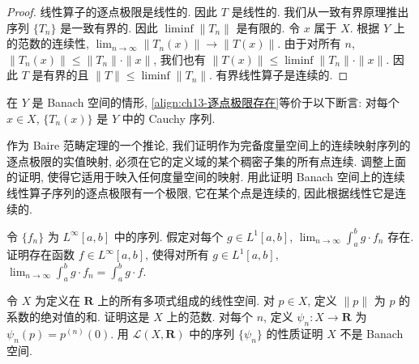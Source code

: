 \documentclass[../../main.tex]{subfiles}
\begin{document}
\begin{proof}
线性算子的逐点极限是线性的. 因此 $T$ 是线性的. 我们从一致有界原理推出序列 $\{T_{n}\}$ 是一致有界的. 因此 $\liminf\|T_{n}\|$ 是有限的. 令 $x$ 属于 $X$. 根据 $Y$ 上的范数的连续性, $\lim_{n\to\infty}\|T_{n}(x)\|\to\|T(x)\|$. 由于对所有 $n$, $\|T_{n}(x)\|\leqslant\|T_{n}\|\cdot\|x\|$, 我们也有 $\|T(x)\|\leqslant\liminf\|T_{n}\|\cdot\|x\|$. 因此 $T$ 是有界的且 $\|T\|\leqslant\liminf\|T_{n}\|$. 有界线性算子是连续的.
\end{proof}

在 $Y$ 是 Banach 空间的情形, \eqref{align:ch13-逐点极限存在}等价于以下断言: 对每个 $x\in X$, $\{T_{n}(x)\}$ 是 $Y$ 中的 Cauchy 序列.

\begin{exercise}\label{exercise:ch13-38}
作为 Baire 范畴定理的一个推论, 我们证明作为完备度量空间上的连续映射序列的逐点极限的实值映射, 必须在它的定义域的某个稠密子集的所有点连续. 调整上面的证明, 使得它适用于映入任何度量空间的映射. 用此证明 Banach 空间上的连续线性算子序列的逐点极限有一个极限, 它在某个点是连续的, 因此根据线性它是连续的.
\end{exercise}

\begin{exercise}\label{exercise:ch13-39}
令 $\{f_{n}\}$ 为 $L^{\infty}[a,b]$ 中的序列. 假定对每个 $g\in L^{1}[a,b]$, $\lim_{n\to\infty}\int_{a}^{b}g\cdot f_{n}$ 存在. 证明存在函数 $f\in L^{\infty}[a,b]$, 使得对所有 $g\in L^{1}[a,b]$, $\lim_{n\to\infty}\int_{a}^{b}g\cdot f_{n}=\int_{a}^{b}g\cdot f$.
\end{exercise}

\begin{exercise}\label{exercise:ch13-40}
令 $X$ 为定义在 $\mathbf{R}$ 上的所有多项式组成的线性空间. 对 $p\in X$, 定义 $\|p\|$ 为 $p$ 的系数的绝对值的和. 证明这是 $X$ 上的范数. 对每个 $n$, 定义 $\psi_{n}:X\to\mathbf{R}$ 为 $\psi_{n}(p)=p^{(n)}(0)$. 用 $\mathcal{L}(X,\mathbf{R})$ 中的序列 $\{\psi_{n}\}$ 的性质证明 $X$ 不是 Banach 空间.
\end{exercise}
\end{document}
